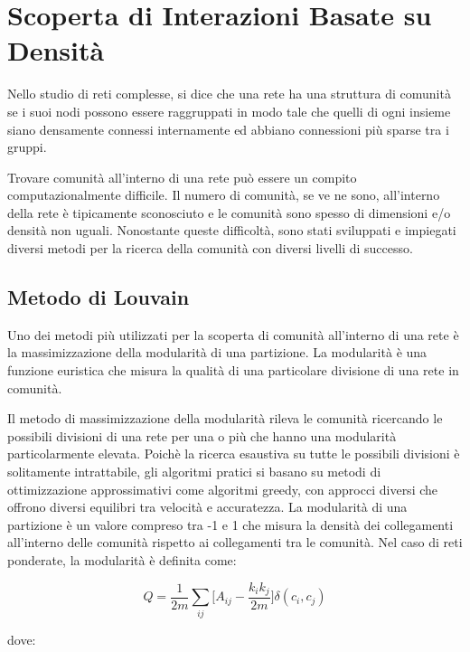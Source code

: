 \section{Scoperta di Interazioni Basate su Densit{\`a}}

Nello studio di reti complesse, si dice che una rete ha una struttura di comunit{\`a} se i suoi nodi possono essere raggruppati in modo tale che quelli di ogni insieme siano densamente connessi internamente ed abbiano connessioni pi{\`u} sparse tra i gruppi.

Trovare comunit{\`a} all'interno di una rete pu{\`o} essere un compito computazionalmente difficile. Il numero di comunit{\`a}, se ve ne sono, all'interno della rete {\`e} tipicamente sconosciuto e le comunit{\`a} sono spesso di dimensioni e/o densit{\`a} non uguali. Nonostante queste difficolt{\`a}, sono stati sviluppati e impiegati diversi metodi per la ricerca della comunit{\`a} con diversi livelli di successo. 

\subsection{Metodo di Louvain}

Uno dei metodi pi{\`u} utilizzati per la scoperta di comunit{\`a} all'interno di una rete {\`e} la massimizzazione della modularit{\`a} di una partizione. La modularit{\`a} {\`e} una funzione euristica che misura la qualit{\`a} di una particolare divisione di una rete in comunit{\`a}. 

Il metodo di massimizzazione della modularit{\`a} rileva le comunit{\`a} ricercando le possibili divisioni di una rete per una o pi{\`u} che hanno una modularit{\`a} particolarmente elevata. Poich{\`e} la ricerca esaustiva su tutte le possibili divisioni {\`e} solitamente intrattabile, gli algoritmi pratici si basano su metodi di ottimizzazione approssimativi come algoritmi greedy, con approcci diversi che offrono diversi equilibri tra velocit{\`a} e accuratezza. La modularit{\`a} di una partizione {\`e} un valore compreso tra -1 e 1 che misura la densit{\`a} dei collegamenti all'interno delle comunit{\`a} rispetto ai collegamenti tra le comunit{\`a}. Nel caso di reti ponderate, la modularit{\`a} {\`e} definita come:

\begin{equation}
Q = \frac{1}{2m} \sum_{ij} \biggl[ A_{ij} - \frac{k_{i} k_{j}}{2m} \biggr] \delta(c_i, c_j)
\end{equation}

dove:

